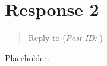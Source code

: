 \documentclass[12pt]{article}
\theoremstyle{definition}
\theoremstyle{plain}
\begin{document}
    \section{Response 2}
      \begin{quote}
        Reply to \textbf{} (\textit{Post ID: }) 
      \end{quote}
      Placeholder.

  \newpage
  \nocite{textbook}
  \printbibliography[
    heading=bibintoc,
    title={Bibliography}
  ]
\end{document}
